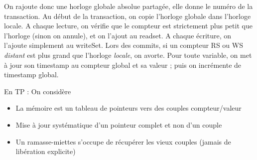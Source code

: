 \documentclass{article}
\begin{document}
On rajoute donc une horloge globale absolue partagée, elle donne le numéro de la transaction. Au début de la transaction, on copie l'horloge globale dans l'horloge locale.
A chaque lecture, on vérifie que le compteur est strictement plus petit que l'horloge (sinon on annule), et on l'ajout au readset. A chaque écriture, on l'ajoute simplement au writeSet.
Lors des commits, si un compteur RS ou WS \emph{distant} est plus grand que l'horloge \emph{locale}, on avorte. Pour toute variable, on met à jour son timestamp au compteur global et sa valeur ; puis on incrémente de timestamp global.
\bigskip

En TP : On considère
\begin{itemize}
\item La mémoire est un tableau de pointeurs vers des couples compteur/valeur
\item Mise à jour systématique d'un pointeur complet et non d'un couple
\item Un ramasse-miettes s'occupe de récupérer les vieux couples (jamais de libération explicite)
\end{itemize}
\end{document}
